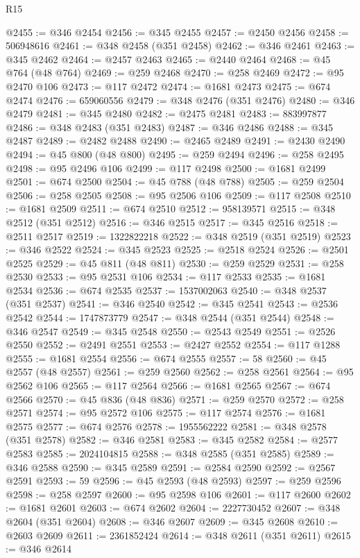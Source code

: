 \begin{lexlean}{R15}
\begin{coremodule}
{{{{{{{{{{{{{{{{{{{{{{{{{{{{{{{{{{{{{{{{{{{{{{{{{{{{{{{{{{{{{{{{{{{{{{@2455 := @346 @2454
@2456 := @345 @2455
@2457 := @2450 @2456
@2458 := 506948616
@2461 := @348 @2458 (@351 @2458)
@2462 := @346 @2461
@2463 := @345 @2462
@2464 := @2457 @2463
@2465 := @2440 @2464
@2468 := @45 @764 (@48 @764)
@2469 := @259 @2468
@2470 := @258 @2469
@2472 := @95 @2470 @106
@2473 := @117 @2472
@2474 := @1681 @2473
@2475 := @674 @2474
@2476 := 659060556
@2479 := @348 @2476 (@351 @2476)
@2480 := @346 @2479
@2481 := @345 @2480
@2482 := @2475 @2481
@2483 := 883997877
@2486 := @348 @2483 (@351 @2483)
@2487 := @346 @2486
@2488 := @345 @2487
@2489 := @2482 @2488
@2490 := @2465 @2489
@2491 := @2430 @2490
@2494 := @45 @800 (@48 @800)
@2495 := @259 @2494
@2496 := @258 @2495
@2498 := @95 @2496 @106
@2499 := @117 @2498
@2500 := @1681 @2499
@2501 := @674 @2500
@2504 := @45 @788 (@48 @788)
@2505 := @259 @2504
@2506 := @258 @2505
@2508 := @95 @2506 @106
@2509 := @117 @2508
@2510 := @1681 @2509
@2511 := @674 @2510
@2512 := 958139571
@2515 := @348 @2512 (@351 @2512)
@2516 := @346 @2515
@2517 := @345 @2516
@2518 := @2511 @2517
@2519 := 1322822218
@2522 := @348 @2519 (@351 @2519)
@2523 := @346 @2522
@2524 := @345 @2523
@2525 := @2518 @2524
@2526 := @2501 @2525
@2529 := @45 @811 (@48 @811)
@2530 := @259 @2529
@2531 := @258 @2530
@2533 := @95 @2531 @106
@2534 := @117 @2533
@2535 := @1681 @2534
@2536 := @674 @2535
@2537 := 1537002063
@2540 := @348 @2537 (@351 @2537)
@2541 := @346 @2540
@2542 := @345 @2541
@2543 := @2536 @2542
@2544 := 1747873779
@2547 := @348 @2544 (@351 @2544)
@2548 := @346 @2547
@2549 := @345 @2548
@2550 := @2543 @2549
@2551 := @2526 @2550
@2552 := @2491 @2551
@2553 := @2427 @2552
@2554 := @117 @1288
@2555 := @1681 @2554
@2556 := @674 @2555
@2557 := 58
@2560 := @45 @2557 (@48 @2557)
@2561 := @259 @2560
@2562 := @258 @2561
@2564 := @95 @2562 @106
@2565 := @117 @2564
@2566 := @1681 @2565
@2567 := @674 @2566
@2570 := @45 @836 (@48 @836)
@2571 := @259 @2570
@2572 := @258 @2571
@2574 := @95 @2572 @106
@2575 := @117 @2574
@2576 := @1681 @2575
@2577 := @674 @2576
@2578 := 1955562222
@2581 := @348 @2578 (@351 @2578)
@2582 := @346 @2581
@2583 := @345 @2582
@2584 := @2577 @2583
@2585 := 2024104815
@2588 := @348 @2585 (@351 @2585)
@2589 := @346 @2588
@2590 := @345 @2589
@2591 := @2584 @2590
@2592 := @2567 @2591
@2593 := 59
@2596 := @45 @2593 (@48 @2593)
@2597 := @259 @2596
@2598 := @258 @2597
@2600 := @95 @2598 @106
@2601 := @117 @2600
@2602 := @1681 @2601
@2603 := @674 @2602
@2604 := 2227730452
@2607 := @348 @2604 (@351 @2604)
@2608 := @346 @2607
@2609 := @345 @2608
@2610 := @2603 @2609
@2611 := 2361852424
@2614 := @348 @2611 (@351 @2611)
@2615 := @346 @2614
}}}}}}}}}}}}}}}}}}}}}}}}}}}}}}}}}}}}}}}}}}}}}}}}}}}}}}}}}}}}}}}}}}}}}}
\end{coremodule}
\end{lexlean}
